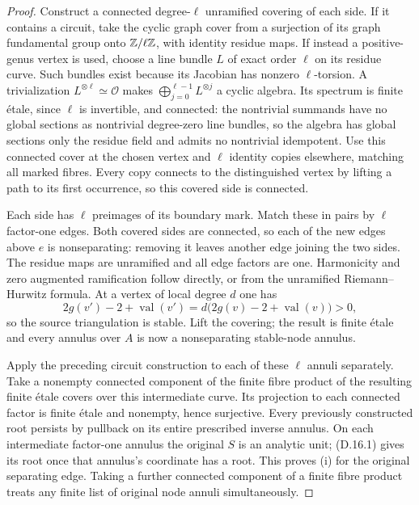 \begin{proof}
Construct a connected degree-$\ell$ unramified covering of each
side. If it contains a circuit, take the cyclic graph cover from
a surjection of its graph fundamental group onto $\mathbb Z/\ell\mathbb Z$,
with identity residue maps. If instead a positive-genus vertex is
used, choose a line bundle $L$ of exact order $\ell$ on its residue
curve. Such bundles exist because its Jacobian has nonzero
$\ell$-torsion. A trivialization $L^{\otimes\ell}\simeq\mathcal O$
makes $\bigoplus_{j=0}^{\ell-1}L^{\otimes j}$ a cyclic algebra.
Its spectrum is finite \'etale, since $\ell$ is invertible,
and connected: the nontrivial summands have no global sections
as nontrivial degree-zero line bundles, so the algebra has global
sections only the residue field and admits no nontrivial idempotent.
Use this connected cover at the chosen vertex and $\ell$ identity
copies elsewhere, matching all marked fibres. Every copy connects
to the distinguished vertex by lifting a path to its first
occurrence, so this covered side is connected.

Each side has $\ell$ preimages of its boundary mark. Match these
in pairs by $\ell$ factor-one edges. Both covered sides are
connected, so each of the new edges above $e$ is nonseparating:
removing it leaves another edge joining the two sides. The residue
maps are unramified and all edge factors are one. Harmonicity
and zero augmented ramification follow directly, or from the
unramified Riemann--Hurwitz formula. At a vertex of local degree
$d$ one has
\[
 2g(v')-2+\operatorname{val}(v')
                =d\bigl(2g(v)-2+\operatorname{val}(v)\bigr)>0,
\]
so the source triangulation is stable. Lift the covering; the
result is finite \'etale and every annulus over $A$ is now a
nonseparating stable-node annulus.

Apply the preceding circuit construction to each of these
$\ell$ annuli separately. Take a nonempty connected component
of the finite fibre product of the resulting finite \'etale
covers over this intermediate curve. Its projection to each
connected factor is finite \'etale and nonempty, hence
surjective. Every previously constructed root persists by
pullback on its entire prescribed inverse annulus. On each
intermediate factor-one annulus the original $S$ is an analytic
unit; (D.16.1) gives its root once that annulus's coordinate
has a root. This proves (i) for the original separating edge.
Taking a further connected component of a finite fibre product
treats any finite list of original node annuli simultaneously.


\end{proof}
